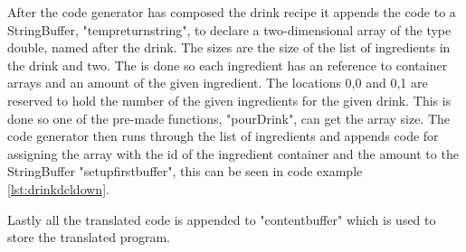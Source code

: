 After the code generator has composed the drink recipe it appends the code to a StringBuffer, "tempreturnstring", to declare a two-dimensional array of the type double, named after the drink. The sizes are the size of the list of ingredients in the drink and two. The is done so each ingredient has an reference to container arrays and an amount of the given ingredient. The locations 0,0 and 0,1 are reserved to hold the number of the given ingredients for the given drink. This is done so one of the pre-made functions, "pourDrink", can get the array size. The code generator then runs through the list of ingredients and appends code for assigning the array with the id of the ingredient container and the amount to the StringBuffer "setupfirstbuffer", this can be seen in code example \ref{lst:drinkdcldown}.

Lastly all the translated code is appended to "contentbuffer" which is used to store the translated program.
